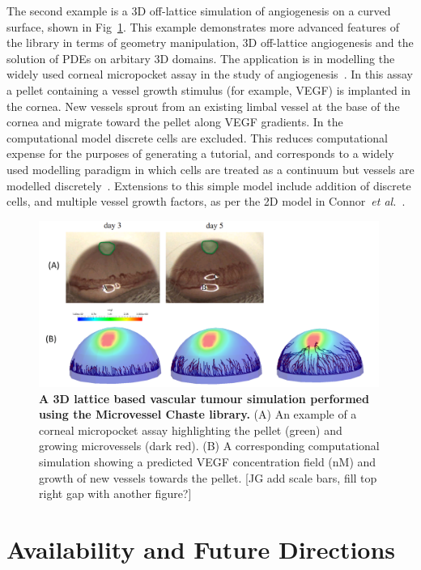 \documentclass[10pt,letterpaper]{article}
\begin{document}
The second example is a 3D off-lattice simulation of angiogenesis on a curved surface, shown in Fig~\ref{fig4}. This example demonstrates more advanced features of the library in terms of geometry manipulation, 3D off-lattice angiogenesis and the solution of PDEs on arbitary 3D domains. The application is in modelling the widely used corneal micropocket assay in the study of angiogenesis~\cite{Connor2015}. In this assay a pellet containing a vessel growth stimulus (for example, VEGF) is implanted in the cornea. New vessels sprout from an existing limbal vessel at the base of the cornea and migrate toward the pellet along VEGF gradients. In the computational model discrete cells are excluded. This reduces computational expense for the purposes of generating a tutorial, and corresponds to a widely used modelling paradigm in which cells are treated as a continuum but vessels are modelled discretely~\cite{Secomb2013}. Extensions to this simple model include addition of discrete cells, and multiple vessel growth factors, as per the 2D model in Connor~\emph{et al.}~\cite{Connor2015}.

\begin{figure}[!h]
\centering
\includegraphics[width=0.99\textwidth]{Fig4.png}
\caption{{\bf A 3D lattice based vascular tumour simulation performed using the Microvessel Chaste library.}
(A) An example of a corneal micropocket assay highlighting the pellet (green) and growing microvessels (dark red). (B) A corresponding computational simulation showing a predicted VEGF concentration field (nM) and growth of new vessels towards the pellet. [JG add scale bars, fill top right gap with another figure?]}
\label{fig4}
\end{figure}

\section*{Availability and Future Directions}
\end{document}
